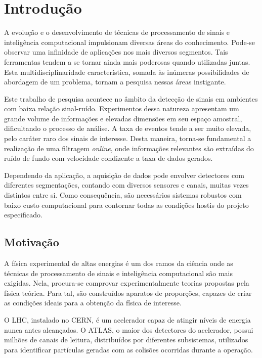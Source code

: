 \chapter{Introdução}

A evolução e o desenvolvimento de técnicas de processamento de sinais e
inteligência computacional impulsionam diversas áreas do conhecimento. Pode-se
observar uma infinidade de aplicações nos mais diversos segmentos. Tais
ferramentas tendem a se tornar ainda mais poderosas quando utilizadas juntas.
Esta multidisciplinaridade característica, somada às inúmeras possibilidades de
abordagem de um problema, tornam a pesquisa nessas áreas instigante.

Este trabalho de pesquisa acontece no âmbito da detecção de sinais em ambientes
com baixa relação sinal-ruído. Experimentos dessa natureza apresentam um grande
volume de informações e elevadas dimensões em seu espaço amostral, dificultando
o processo de análise. A taxa de eventos tende a ser muito
elevada, pelo caráter raro dos sinais de interesse. Desta maneira, torna-se
fundamental a realização de uma filtragem \emph{online}, onde informações
relevantes são extraídas do ruído de fundo com velocidade condizente a taxa de
dados gerados.

Dependendo da aplicação, a aquisição de dados pode envolver detectores com
diferentes segmentações, contando com diversos sensores e canais, muitas vezes
distintos entre si.  Como consequência, são necessários sistemas robustos com
baixo custo computacional para contornar todas as condições hostis do projeto
especificado.

\section{Motivação}

A física experimental de altas energias é um dos ramos da ciência onde as
técnicas de processamento de sinais e inteligência computacional são mais
exigidas. Nela, procura-se comprovar experimentalmente teorias propostas pela
física teórica. Para tal, são construídos aparatos de proporções,
capazes de criar as condições ideais para a obtenção da física de interesse.

O LHC, instalado no CERN, é um acelerador capaz de atingir níveis de energia
nunca antes alcançados. O ATLAS, o maior dos detectores do acelerador, possui
milhões de canais de leitura, distribuídos por diferentes subsistemas,
utilizados para identificar partículas geradas com as colisões ocorridas durante
a operação.

